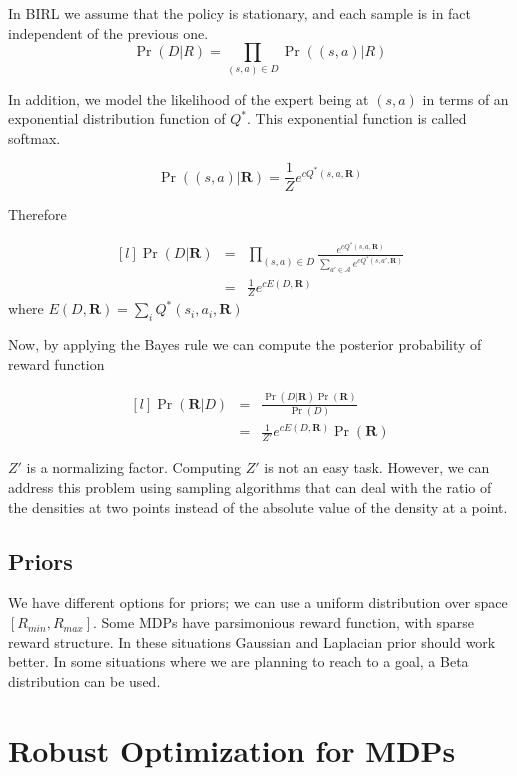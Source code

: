 \documentclass{article}
\theoremstyle{remark}
\theoremstyle{remark}
\theoremstyle{remark}
\theoremstyle{remark}
\theoremstyle{remark}
\theoremstyle{remark}
\begin{document}
In BIRL we assume that the policy is stationary, and each sample is in fact independent of the previous one. 
\[
  \Pr(D|R) = \prod_{(s,a) \in D} \Pr((s,a)|R) 
\]

In addition, we model the likelihood of the expert being at $(s,a)$ in terms of an exponential distribution function of $Q^*$. This exponential function is called softmax.

\[
  \Pr((s,a)|\mathbf{R}) = \frac{1}{Z} e^{cQ^*(s, a, \mathbf{R})}
\]

Therefore

\[
\begin{matrix*}[l]
  \Pr(D|\mathbf{R}) & = & \prod_{(s,a) \in D} \frac{e^{cQ^*(s, a, \mathbf{R})}}{\sum_{a' \in \mathcal{A}}{e^{cQ^*(s, a', \mathbf{R})}}} \\
   & = & \frac{1}{Z} e^{c E(D,\mathbf{R})}
\end{matrix*}
\]
where $E(D, \mathbf{R}) = \sum_i Q^*(s_i, a_i, \mathbf{R})$

Now, by applying the Bayes rule we can compute the posterior probability of reward function

\[
\begin{matrix*}[l]

\Pr(\mathbf{R}|D) & = & \frac{\Pr(D|\mathbf{R})\Pr(\mathbf{R})}{\Pr(D)} \\
& = & \frac{1}{Z'} e^{c E(D, \mathbf{R})} \Pr(\mathbf{R})
\end{matrix*}
\]

$Z'$ is a normalizing factor. Computing $Z'$ is not an easy task. However, we can address this problem using sampling algorithms that can deal with the ratio of the densities at two points instead of the absolute value of the density at a point.

\subsection*{Priors}

We have different options for priors; we can use a uniform distribution over space $[R_{min}, R_{max}]$. Some MDPs have parsimonious reward function, with sparse reward structure. In these situations Gaussian and Laplacian prior should work better. In some situations where we are planning to reach to a goal, a Beta distribution can be used.

\section*{Robust Optimization for MDPs}
\end{document}
